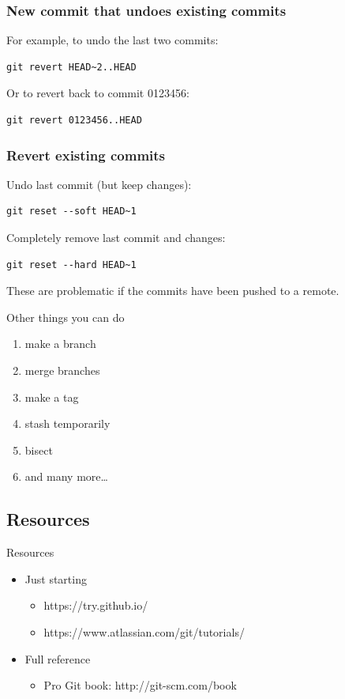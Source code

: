\documentclass{beamer}
\begin{document}
\begin{frame}[fragile]
  \frametitle{New commit that undoes existing commits}
For example, to undo the last two commits:
  \begin{lstlisting}
git revert HEAD~2..HEAD
  \end{lstlisting}
Or to revert back to commit 0123456:
  \begin{lstlisting}
git revert 0123456..HEAD
  \end{lstlisting}
\end{frame}

\begin{frame}[fragile]
  \frametitle{Revert existing commits}
Undo last commit (but keep changes):
  \begin{lstlisting}
git reset --soft HEAD~1
  \end{lstlisting}
Completely remove last commit and changes:
  \begin{lstlisting}
git reset --hard HEAD~1
  \end{lstlisting}
These are problematic if the commits have been pushed to a remote.
\end{frame}

\begin{frame}{Other things you can do}
  \begin{enumerate}
    \item make a branch
    \item merge branches
    \item make a tag
    \item stash temporarily
    \item bisect
    \item and many more\ldots
  \end{enumerate}
\end{frame}

\subsection{Resources}
\begin{frame}{Resources}
  \begin{itemize}
    \item Just starting
      \begin{itemize}
        \item https://try.github.io/
        \item https://www.atlassian.com/git/tutorials/
      \end{itemize}
    \item Full reference
      \begin{itemize}
        \item Pro Git book: http://git-scm.com/book
      \end{itemize}
  \end{itemize}
\end{frame}
\end{document}
